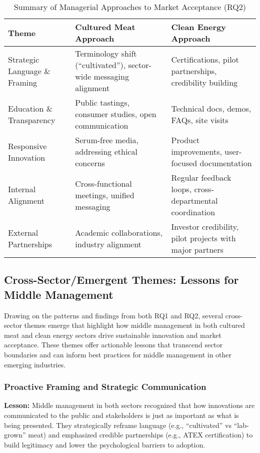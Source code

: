 \begin{table}[h!]
	\centering
	\caption{Summary of Managerial Approaches to Market Acceptance (RQ2)}
	\label{tab:rq2_summary}
	\begin{tabularx}{\textwidth}{@{}lXX@{}}
		\toprule
		\textbf{Theme} & \textbf{Cultured Meat Approach} & \textbf{Clean Energy Approach} \\
		\midrule
		Strategic Language \& Framing & Terminology shift (“cultivated”), sector-wide messaging alignment & Certifications, pilot partnerships, credibility building \\
		\addlinespace
		Education \& Transparency & Public tastings, consumer studies, open communication & Technical docs, demos, FAQs, site visits \\
		\addlinespace
		Responsive Innovation & Serum-free media, addressing ethical concerns & Product improvements, user-focused documentation \\
		\addlinespace
		Internal Alignment & Cross-functional meetings, unified messaging & Regular feedback loops, cross-departmental coordination \\
		\addlinespace
		External Partnerships & Academic collaborations, industry alignment & Investor credibility, pilot projects with major partners \\
		\bottomrule
	\end{tabularx}
\end{table}

\subsection{Cross-Sector/Emergent Themes: Lessons for Middle Management}
Drawing on the patterns and findings from both RQ1 and RQ2, several cross-sector themes emerge that highlight how middle management in both cultured meat and clean energy sectors drive sustainable innovation and market acceptance. These themes offer actionable lessons that transcend sector boundaries and can inform best practices for middle management in other emerging industries.

\subsubsection{Proactive Framing and Strategic Communication}
\noindent\textbf{Lesson:} Middle management in both sectors recognized that how innovations are communicated to the public and stakeholders is just as important as what is being presented. They strategically reframe language (e.g., “cultivated” vs “lab-grown” meat) and emphasized credible partnerships (e.g., ATEX certification) to build legitimacy and lower the psychological barriers to adoption.

